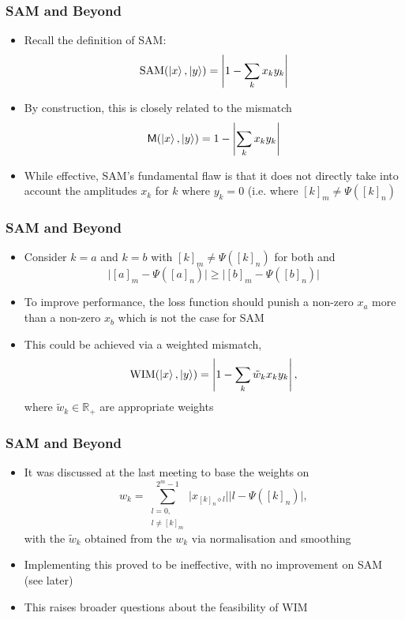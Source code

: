 \documentclass{beamer}
\begin{document}
\begin{frame}
\frametitle{SAM and Beyond}
\begin{itemize}
\item Recall the definition of \alert{SAM}:
\begin{equation}
\text{SAM}(\ket{x}, \ket{y}) = \left\vert 1 - \sum_k x_k y_k \right\vert 
\end{equation}
\item By construction, this is closely related to the \alert{mismatch} 
\begin{equation}
\mathsf{M}(\ket{x}, \ket{y}) = 1 - \left|\sum_k x_k y_k\right|
\end{equation}
\item While effective, SAM's \alert{fundamental flaw} is that it does not directly take into account the amplitudes $x_k$ for $k$ where $y_k =0$ (i.e. where $[k]_m \neq \Psi([k]_n)$
\end{itemize}
\end{frame}

\begin{frame}
\frametitle{SAM and Beyond}
\begin{itemize}
\item Consider $k=a$ and $k=b$ with $[k]_m \neq \Psi([k]_n)$ for both and 
\begin{equation}
\Big|[a]_m - \Psi([a]_n) \Big| \geq \Big|[b]_m - \Psi([b]_n) \Big| 
\end{equation}
\item To improve performance, the loss function should punish a non-zero $x_a$ more than a non-zero $x_b$ which is not the case for SAM
\item This could be achieved via a \alert{weighted mismatch}, 
\begin{equation}
\text{WIM}(\ket{x}, \ket{y}) = \left\vert 1 - \sum_k \tilde{w}_k x_k y_k \right\vert, 
\end{equation}
where $\tilde{w}_k \in \mathbb{R}_+$ are appropriate weights
\end{itemize}
\end{frame}

\begin{frame}
\frametitle{SAM and Beyond}
\begin{itemize}
\item It was discussed at the last meeting to base the weights on
\begin{equation}
w_k = \sum^{2^m -1}_{\substack{l=0, \\ l \neq [k]_m}} \Big|x_{[k]_n \diamond l} \Big| \Big| l - \Psi([k]_n) \Big|,
\end{equation}
with the $\tilde{w}_k$ obtained from the $w_k$ via normalisation and smoothing
\item Implementing this \alert{proved to be ineffective}, with no improvement on SAM  (see later)
\item This raises broader questions about the \alert{feasibility of WIM}
\end{itemize}
\end{frame}
\end{document}
